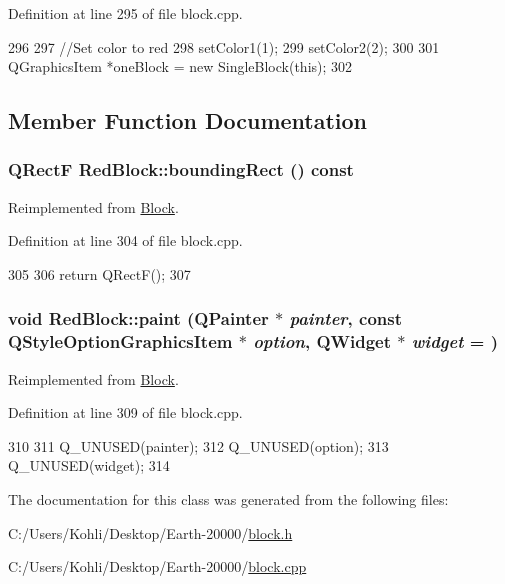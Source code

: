 Definition at line 295 of file block.cpp.


\begin{DoxyCode}
296 {
297     //Set color to red
298     setColor1(1);
299     setColor2(2);
300 
301     QGraphicsItem *oneBlock = new SingleBlock(this);
302 }
\end{DoxyCode}


\subsection{Member Function Documentation}
\hypertarget{class_red_block_a31036897a1451c6140ce9f368e461fb0}{
\subsubsection[{boundingRect}]{\setlength{\rightskip}{0pt plus 5cm}QRectF RedBlock::boundingRect () const}}
\label{class_red_block_a31036897a1451c6140ce9f368e461fb0}


Reimplemented from \hyperlink{class_block_aee4444b92a82f5a8080e9019ef1e554d}{Block}.

Definition at line 304 of file block.cpp.


\begin{DoxyCode}
305 {
306     return QRectF();
307 }
\end{DoxyCode}
\hypertarget{class_red_block_a78013615dbc11158d47eb38cc3d416cd}{
\subsubsection[{paint}]{\setlength{\rightskip}{0pt plus 5cm}void RedBlock::paint (QPainter $\ast$ {\em painter}, \/  const QStyleOptionGraphicsItem $\ast$ {\em option}, \/  QWidget $\ast$ {\em widget} = {})}}
\label{class_red_block_a78013615dbc11158d47eb38cc3d416cd}


Reimplemented from \hyperlink{class_block_a36791d086b6fad1a2203bfef6fdbaa0a}{Block}.

Definition at line 309 of file block.cpp.


\begin{DoxyCode}
310 {
311     Q_UNUSED(painter);
312     Q_UNUSED(option);
313     Q_UNUSED(widget);
314 }
\end{DoxyCode}


The documentation for this class was generated from the following files:\begin{DoxyCompactItemize}
\item 
C:/Users/Kohli/Desktop/Earth-\/20000/\hyperlink{block_8h}{block.h}\item 
C:/Users/Kohli/Desktop/Earth-\/20000/\hyperlink{block_8cpp}{block.cpp}\end{DoxyCompactItemize}

